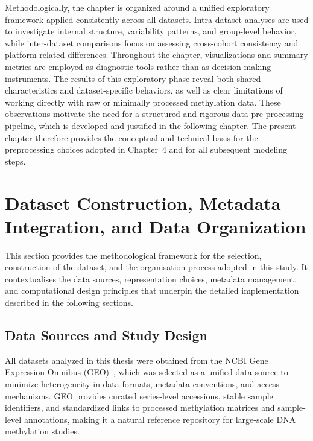 Methodologically, the chapter is organized around a unified exploratory framework applied consistently across all datasets. Intra-dataset analyses are used to investigate internal structure, variability patterns, and group-level behavior, while inter-dataset comparisons focus on assessing cross-cohort consistency and platform-related differences. Throughout the chapter, visualizations and summary metrics are employed as diagnostic tools rather than as decision-making instruments.
The results of this exploratory phase reveal both shared characteristics and dataset-specific behaviors, as well as clear limitations of working directly with raw or minimally processed methylation data. These observations motivate the need for a structured and rigorous data pre-processing pipeline, which is developed and justified in the following chapter. The present chapter therefore provides the conceptual and technical basis for the preprocessing choices adopted in Chapter~4 and for all subsequent modeling steps.

\section{Dataset Construction, Metadata Integration, and Data Organization}

This section provides the methodological framework for the selection, construction of the dataset, and the organisation process adopted in this study. It contextualises the data sources, representation choices, metadata management, and computational design principles that underpin the detailed implementation described in the following sections.

\subsection{Data Sources and Study Design}

All datasets analyzed in this thesis were obtained from the NCBI Gene Expression Omnibus (GEO)~\cite{GEO_NCBI}, which was selected as a unified data source to minimize heterogeneity in data formats, metadata conventions, and access mechanisms. GEO provides curated series-level accessions, stable sample identifiers, and standardized links to processed methylation matrices and sample-level annotations, making it a natural reference repository for large-scale DNA methylation studies.

